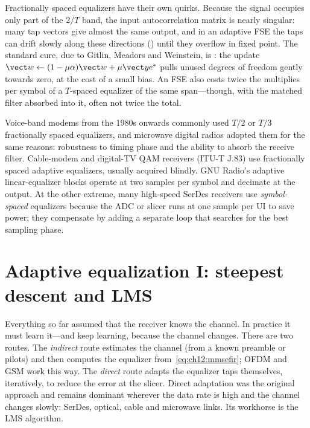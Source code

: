 
Fractionally spaced equalizers have their own quirks. Because the signal occupies only part of the
$2/T$ band, the input autocorrelation matrix is nearly singular: many tap vectors give almost the
same output, and in an adaptive FSE the taps can drift slowly along these directions () until they overflow in fixed point. The standard cure, due to Gitlin, Meadors and
Weinstein, is : the update $\vect w\leftarrow(1-\mu\alpha)\vect w+\mu\vect y e^*$
pulls unused degrees of freedom gently towards zero, at the cost of a small bias. An FSE also costs
twice the multiplies per symbol of a $T$-spaced equalizer of the same span---though, with the
matched filter absorbed into it, often not twice the total.

\begin{inpractice}
Voice-band modems from the 1980s onwards commonly used $T/2$ or $T/3$ fractionally spaced
equalizers, and microwave digital radios adopted them for the same reasons: robustness to timing
phase and the ability to absorb the receive filter. Cable-modem and digital-TV QAM receivers
(ITU-T J.83) use fractionally spaced adaptive equalizers, usually acquired blindly. GNU Radio's
adaptive linear-equalizer blocks operate at two samples per symbol and decimate at the output.
At the other extreme, many high-speed SerDes receivers use \emph{symbol-spaced} equalizers because
the ADC or slicer runs at one sample per UI to save power; they compensate by adding a separate
loop that searches for the best sampling phase.
\end{inpractice}

\section{Adaptive equalization I: steepest descent and LMS}
\label{sec:ch12:lms}

Everything so far assumed that the receiver knows the channel. In practice it must learn it---and
keep learning, because the channel changes. There are two routes. The \emph{indirect} route
estimates the channel (from a known preamble or pilots) and then computes the equalizer
from~\eqref{eq:ch12:mmsefir}; OFDM and GSM work this way. The \emph{direct} route adapts the
equalizer taps themselves, iteratively, to reduce the error at the slicer. Direct adaptation was
the original approach and remains dominant wherever the data rate is high and the channel changes
slowly: SerDes, optical, cable and microwave links. Its workhorse is the LMS algorithm.

